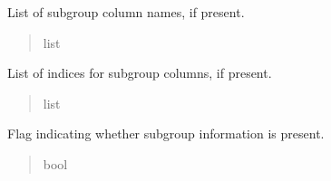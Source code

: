 \documentclass[letterpaper,10pt,english]{sphinxmanual}
\begin{document}
\begin{fulllineitems}
\begin{fulllineitems}
\label{\detokenize{calzone:calzone.utils.data_loader.subgroups}}
\pysigstartsignatures
{}
\pysigstopsignatures
\sphinxAtStartPar
List of subgroup column names, if present.
\begin{quote}\begin{description}
\sphinxAtStartPar
list

\end{description}\end{quote}

\end{fulllineitems}


\begin{fulllineitems}
\label{\detokenize{calzone:calzone.utils.data_loader.subgroup_indices}}
\pysigstartsignatures
{}
\pysigstopsignatures
\sphinxAtStartPar
List of indices for subgroup columns, if present.
\begin{quote}\begin{description}
\sphinxAtStartPar
list

\end{description}\end{quote}

\end{fulllineitems}


\begin{fulllineitems}
\label{\detokenize{calzone:calzone.utils.data_loader.have_subgroup}}
\pysigstartsignatures
{}
\pysigstopsignatures
\sphinxAtStartPar
Flag indicating whether subgroup information is present.
\begin{quote}\begin{description}
\sphinxAtStartPar
bool

\end{description}\end{quote}

\end{fulllineitems}


\end{fulllineitems}
\end{document}
